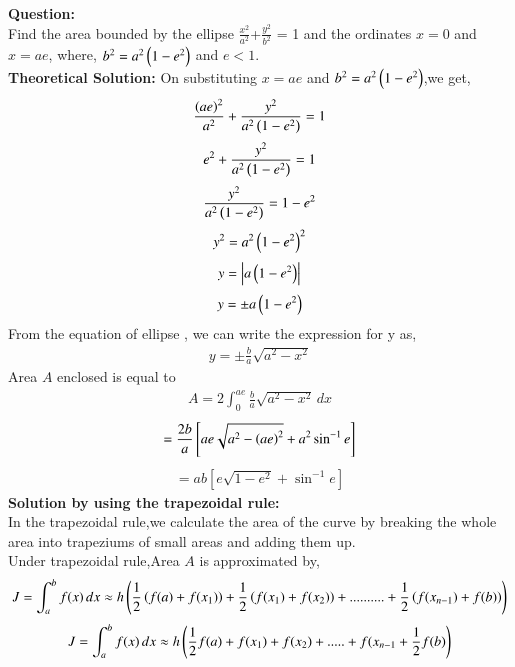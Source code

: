 \documentclass[journal]{IEEEtran}
\begin{document}
\textbf{Question:}
\\
Find the area bounded by the ellipse $\frac{x^2}{a^2}$+$\frac{y^2}{b^2}$ = 1 and the ordinates $x=0$ and $x = ae$, where, $b^2 = a^2\left(1 - e^2\right)$ and $e < 1$.
\\
\textbf{ Theoretical Solution: }
On substituting $x = ae$ and $b^2 = a^2\left(1 - e^2\right)$,we get,
\begin{align}
    \frac{\left(ae\right)^2}{a^2} + \frac{y^2}{a^2\left(1 - e^2\right)} = 1
\end{align}
\begin{align}
     e^2 + \frac{y^2}{a^2\left(1 - e^2\right)} = 1
\end{align}
\begin{align}
    \frac{y^2}{a^2\left(1 - e^2\right)} = 1 - e^2
\end{align}
\begin{align}
    y^2 = a^2\left(1 - e^2\right)^2
\end{align}
\begin{align}
     y = \left\vert a\left(1 - e^2\right)\right\vert
\end{align}
\begin{align}
    y = \pm  a\left(1 - e^2\right)
\end{align}
From the equation of ellipse , we can write the expression for y as,
\begin{align}
    y = \pm \frac{b}{a}\sqrt{a^2 - x^2}
\end{align}
Area $A$ enclosed is equal to 
\begin{align}
    A = 2\int_0^{ae} \frac{b}{a}\sqrt{a^2 - x^2}\,dx
    \end{align}
    \begin{align}
      = \frac{2b}{a}\left[ae\sqrt{a^2 - \left(ae\right)^2} + a^2\sin^{-1}{e} \right]
      \end{align}
\begin{align}
      = ab\left[e\sqrt{1 - e^2} + \sin^{-1}{e}\right]
\end{align}
\textbf{Solution by using the trapezoidal rule:}
\\
In the trapezoidal rule,we calculate the area of the curve by breaking the whole area into trapeziums of small areas and adding them up.\\
Under trapezoidal rule,Area $A$ is approximated by,
\begin{align}
    J = \int_a^b f(x)\,dx \approx h\left(\frac{1}{2}\left(f(a) + f(x_1)\right) + \frac{1}{2}\left(f(x_1) + f(x_2)\right) + ..........+ \frac{1}{2}\left(f(x_{n-1})+ f(b)\right)\right)
\end{align}
\begin{align}
    J = \int_a^b f(x)\,dx \approx h\left(\frac{1}{2}f(a) + f(x_1) + f(x_2) + ..... + f(x_{n-1} + \frac{1}{2}f(b)\right)
\end{align}
\end{document}
